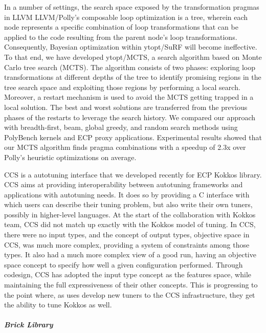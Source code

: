 In a number of settings, the search space exposed by the transformation pragmas in LLVM LLVM/Polly’s composable loop optimization is a tree, wherein each node represents a specific combination of loop transformations that can be applied to the code resulting from the parent node's loop transformations. Consequently, Bayesian optimization within ytopt/SuRF will become ineffective. To that end, we have developed ytopt/MCTS, a search algorithm based on Monte Carlo tree search (MCTS). The algorithm consists of two phases: exploring loop transformations at different depths of the tree to identify promising regions in the tree search space and exploiting those regions by performing a local search. Moreover, a restart mechanism is used to avoid the MCTS getting trapped in a local solution. The best and worst solutions are transferred from the previous phases of the restarts to leverage the search history. We compared our approach with breadth-first, beam, global greedy, and random search methods using PolyBench kernels and ECP proxy applications. Experimental results showed that our MCTS algorithm finds pragma combinations with a speedup of 2.3x over Polly's heuristic optimizations on average.

CCS is a autotuning interface that we developed recently for ECP Kokkos library. CCS aims at providing interoperability between autotuning frameworks and applications with autotuning needs. It does so by providing a C interface with which users can describe their tuning problem, but also write their own tuners, possibly in higher-level languages. At the start of the collaboration with Kokkos team, CCS did not match up exactly with the Kokkos model of tuning. In CCS, there were no input types, and the concept of output types, objective space in CCS, was much more complex, providing a system of constraints among those types. It also had a much more complex view of a good run, having an objective space concept to specify how well a given configuration performed. Through codesign, CCS has adopted the input type concept as the features space, while maintaining the full expressiveness of their other concepts. This is progressing to the point where, as uses develop new tuners to the CCS infrastructure, they get the ability to tune Kokkos as well.



\subparagraph{Brick Library}

